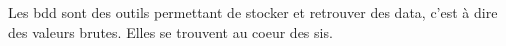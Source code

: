 Les \gls{bdd} sont des outils permettant de stocker et retrouver des \gls{data}, c'est à dire des valeurs brutes. Elles se trouvent au coeur des \glspl{si}.
